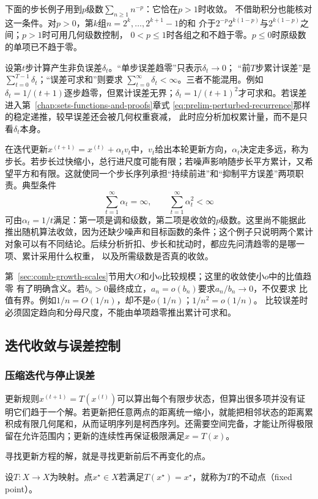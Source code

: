 下面的步长例子用到$p$级数$\sum_{n\geq1}n^{-p}$：它恰在$p>1$时收敛。
不借助积分也能核对这一条件。对$p>0$，第$k$组$n=2^k,\ldots,2^{k+1}-1$的和
介于$2^{-p}2^{k(1-p)}$与$2^{k(1-p)}$之间；$p>1$时可用几何级数控制，
$0<p\leq1$时各组之和不趋于零。$p\leq0$时原级数的单项已不趋于零。

设第$t$步计算产生非负误差$\delta_t$。“单步误差趋零”只表示$\delta_t\to0$； “前$T$步累计误差”是$\sum_{t=0}^{T-1}\delta_t$；“误差可求和”则要求 $\sum_{t=0}^{\infty}\delta_t<\infty$。三者不能混用。例如 $\delta_t=1/(t+1)$逐步趋零，但累计误差无界；$\delta_t=1/(t+1)^2$才可求和。若误差进入第~\ref{chap:sets-functions-and-proofs}章式
\eqref{eq:prelim-perturbed-recurrence}那样的稳定递推，较早误差还会被几何权重衰减， 此时应分析加权累计量，而不是只看$\delta_t$本身。

在迭代更新$x^{(t+1)}=x^{(t)}+\alpha_t v_t$中，$v_t$给出本轮更新方向，$\alpha_t$决定走多远，称为步长。若步长过快缩小，总行进尺度可能有限；若噪声影响随步长平方累计，又希望平方和有限。这就使同一个步长序列承担“持续前进”和“抑制平方误差”两项职责。典型条件
\[   \sum_{t=1}^{\infty}\alpha_t=\infty,   \qquad   \sum_{t=1}^{\infty}\alpha_t^2<\infty \]
可由$\alpha_t=1/t$满足：第一项是调和级数，第二项是收敛的$p$级数。这里尚不能据此推出随机算法收敛，因为还缺少噪声和目标函数的条件；这个例子只说明两个累计对象可以有不同结论。后续分析折扣、步长和扰动时，都应先问清趋零的是哪一项、累计采用什么权重， 以及所需级数是否真的收敛。


第~\ref{sec:comb-growth-scales}节用大$O$和小$o$比较规模；这里的收敛使小$o$中的比值趋零
有了明确含义。若$b_n>0$最终成立，$a_n=o(b_n)$要求$a_n/b_n\to0$，不仅要求
比值有界。例如$1/n=O(1/n)$，却不是$o(1/n)$；$1/n^2=o(1/n)$。
比较误差时必须固定趋向和分母尺度，不能由单项趋零推出累计可求和。

\subsection{迭代收敛与误差控制}
\subsubsection{压缩迭代与停止误差}
\label{sec:analysis-complete-contraction}

更新规则$x^{(t+1)}=T(x^{(t)})$可以算出每个有限步状态，但算出很多项并没有证明它们趋于一个解。若更新把任意两点的距离统一缩小，就能把相邻状态的距离累积成有限几何尾和，从而证明序列是柯西序列。还需要空间完备，才能让所得极限留在允许范围内；更新的连续性再保证极限满足$x=T(x)$。


寻找更新方程的解，就是寻找更新前后不再变化的点。
\begin{definition}[不动点]
\label{def:analysis-fixed-point}
设$T:X\to X$为映射。点$x^\star\in X$若满足$T(x^\star)=x^\star$，就称为$T$的不动点（fixed point）。
\end{definition}

